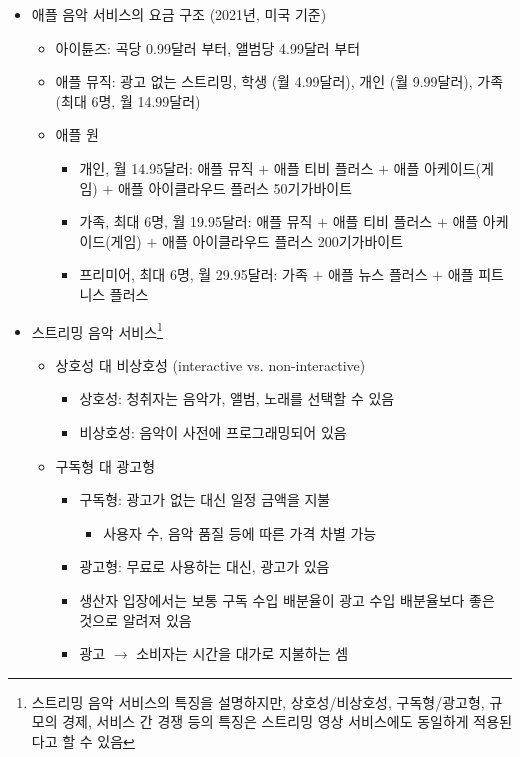\begin{itemize}
\item 애플 음악 서비스의 요금 구조 (2021년, 미국 기준)
	\begin{itemize}
	\item 아이튠즈: 곡당 0.99달러 부터, 앨범당 4.99달러 부터
	\item 애플 뮤직: 광고 없는 스트리밍, 학생 (월 4.99달러), 개인 (월 9.99달러), 가족(최대 6명, 월 14.99달러)
	\item 애플 원
		\begin{itemize}
		\item 개인, 월 14.95달러: 애플 뮤직 $+$ 애플 티비 플러스 $+$ 애플 아케이드(게임) $+$ 애플 아이클라우드 플러스 50기가바이트
		\item 가족, 최대 6명, 월 19.95달러: 애플 뮤직 $+$ 애플 티비 플러스 $+$ 애플 아케이드(게임) $+$ 애플 아이클라우드 플러스 200기가바이트
		\item 프리미어, 최대 6명, 월 29.95달러: 가족 $+$ 애플 뉴스 플러스 $+$ 애플 피트니스 플러스
		\end{itemize}
	\end{itemize}
\item 스트리밍 음악 서비스\footnote{스트리밍 음악 서비스의 특징을 설명하지만, 상호성/비상호성, 구독형/광고형, 규모의 경제, 서비스 간 경쟁 등의 특징은 스트리밍 영상 서비스에도 동일하게 적용된다고 할 수 있음} \cite[8장]{Krueger:2021aa}	
	\begin{itemize}
	\item 상호성 대 비상호성 (interactive vs. non-interactive)
		\begin{itemize}
		\item 상호성: 청취자는 음악가, 앨범, 노래를 선택할 수 있음
		\item 비상호성: 음악이 사전에 프로그래밍되어 있음
		\end{itemize}
	\item 구독형 대 광고형
		\begin{itemize}
		\item 구독형: 광고가 없는 대신 일정 금액을 지불
			\begin{itemize}
			\item 사용자 수, 음악 품질 등에 따른 가격 차별 가능
			\end{itemize}
		\item 광고형: 무료로 사용하는 대신, 광고가 있음
		\item 생산자 입장에서는 보통 구독 수입 배분율이 광고 수입 배분율보다 좋은 것으로 알려져 있음
		\item 광고 $\rightarrow$ 소비자는 시간을 대가로 지불하는 셈
			\begin{itemize}

\end{itemize}
\end{itemize}
\end{itemize}
\end{itemize}
